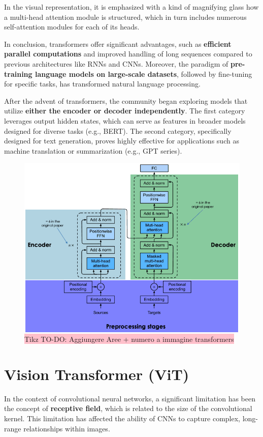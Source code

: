 In the visual representation, it is emphasized with a kind of magnifying glass how a multi-head attention module is structured, which in turn includes numerous self-attention modules for each of its heads.

In conclusion, transformers offer significant advantages, such as \textbf{efficient parallel computations} and improved handling of long sequences compared to previous architectures like RNNs and CNNs. Moreover, the paradigm of \textbf{pre-training language models on large-scale datasets}, followed by fine-tuning for specific tasks, has transformed natural language processing.

After the advent of transformers, the community began exploring models that utilize \textbf{either the encoder or decoder independently}. The first category leverages output hidden states, which can serve as features in broader models designed for diverse tasks (e.g., BERT). The second category, specifically designed for text generation, proves highly effective for applications such as machine translation or summarization (e.g., GPT series).

\begin{figure}[!htbp]
    \centering
    \includegraphics[width=0.85\linewidth]{tikz/AGGIUNGI A IMMAGINE TRANSFORMERS.png}
    \caption{{\color{red}\colorbox{pink}{Tikz TO-DO: Aggiungere Aree + numero a immagine transformers}}}
\end{figure}

\section{Vision Transformer (ViT)}


In the context of convolutional neural networks, a significant limitation has been the concept of \textbf{receptive field}, which is related to the size of the convolutional kernel. This limitation has affected the ability of CNNs to capture complex, long-range relationships within images.

